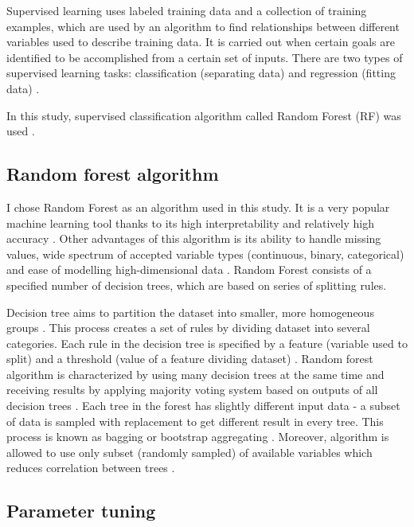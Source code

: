 \documentclass{amuthesis}
\begin{document}
Supervised learning uses labeled training data and a collection of
training examples, which are used by an algorithm to find relationships
between different variables used to describe training data. It is
carried out when certain goals are identified to be accomplished from a
certain set of inputs. There are two types of supervised learning tasks:
classification (separating data) and regression (fitting data)
\autocite{sarker_machine_2021}.

In this study, supervised classification algorithm called Random Forest
(RF) was used \autocite{breiman_random_2001}.

\hypertarget{sec-rf}{%
\subsection{Random forest algorithm}\label{sec-rf}}

I chose Random Forest as an algorithm used in this study. It is a very
popular machine learning tool thanks to its high interpretability and
relatively high accuracy \autocite{qi_random_2012}. Other advantages of
this algorithm is its ability to handle missing values, wide spectrum of
accepted variable types (continuous, binary, categorical) and ease of
modelling high-dimensional data \autocite{qi_random_2012}. Random Forest
consists of a specified number of decision trees, which are based on
series of splitting rules.

Decision tree aims to partition the dataset into smaller, more
homogeneous groups \autocite{kuhn_applied_2013}. This process creates a
set of rules by dividing dataset into several categories. Each rule in
the decision tree is specified by a feature (variable used to split) and
a threshold (value of a feature dividing dataset)
\autocite{sekulic_random_2020}. Random forest algorithm is characterized
by using many decision trees at the same time and receiving results by
applying majority voting system based on outputs of all decision trees
\autocite{kuhn_applied_2013}. Each tree in the forest has slightly
different input data - a subset of data is sampled with replacement to
get different result in every tree. This process is known as bagging or
bootstrap aggregating \autocite{schonlau_random_2020}. Moreover,
algorithm is allowed to use only subset (randomly sampled) of available
variables which reduces correlation between trees
\autocite{sohil_introduction_2022}.

\hypertarget{sec-tuning}{%
\subsection{Parameter tuning}\label{sec-tuning}}
\end{document}

